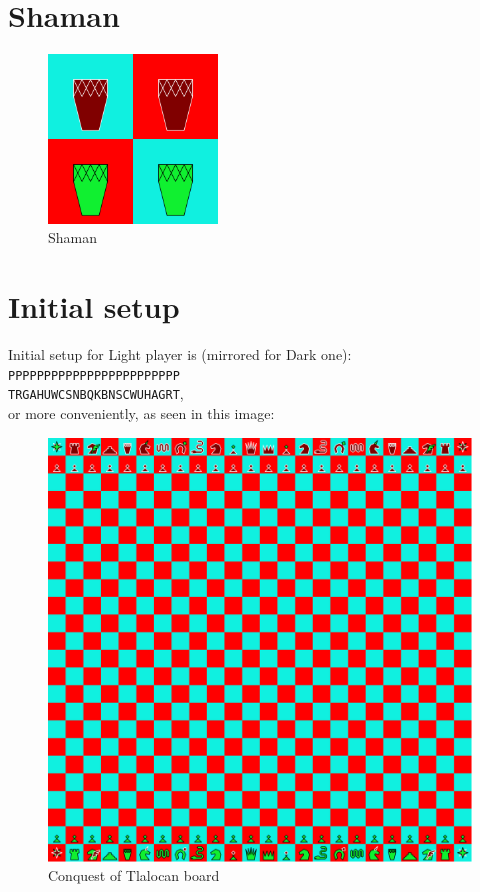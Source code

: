 \documentclass[a5paper,12pt,draft]{book} %
\begin{document}
\section*{Shaman}

\noindent
\begin{figure}
\includegraphics[width=0.4\textwidth, keepaspectratio=true]{../gfx/pieces/14_shaman.png}
\caption{Shaman}
\label{fig:shaman}
\end{figure}

\clearpage

\section*{Initial setup}

Initial setup for Light player is (mirrored for Dark one):
\texttt{PPPPPPPPPPPPPPPPPPPPPPPP \\
        TRGAHUWCSNBQKBNSCWUHAGRT}, \\
or more conveniently, as seen in this image:

\noindent
\begin{figure}[h]
\includegraphics[width=1.0\textwidth, keepaspectratio=true]{../gfx/boards/18_conquest_of_tlalocan.png}
\caption{Conquest of Tlalocan board}
\label{fig:conquest_of_tlalocan}
\end{figure}
\end{document}
